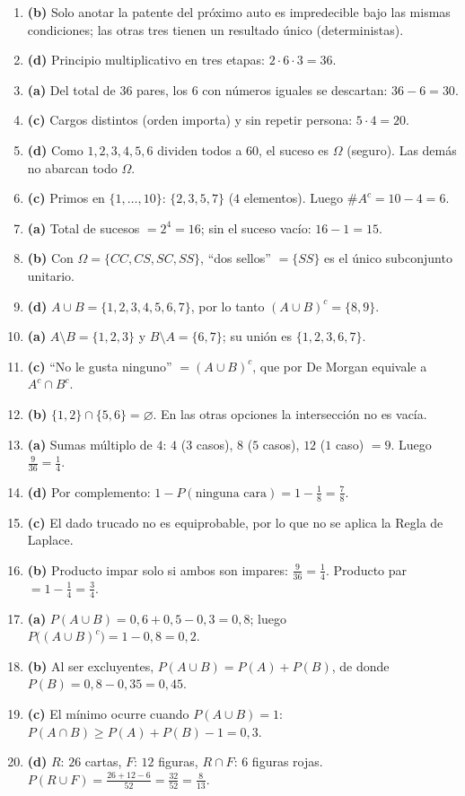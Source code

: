\documentclass[12pt, a4paper]{article}
\begin{document}
\begin{enumerate}[leftmargin=*, itemsep=4pt]
    \item \textbf{(b)} Solo anotar la patente del próximo auto es impredecible bajo las mismas condiciones; las otras tres tienen un resultado único (deterministas).
    \item \textbf{(d)} Principio multiplicativo en tres etapas: $2 \cdot 6 \cdot 3 = 36$.
    \item \textbf{(a)} Del total de $36$ pares, los $6$ con números iguales se descartan: $36 - 6 = 30$.
    \item \textbf{(c)} Cargos distintos (orden importa) y sin repetir persona: $5 \cdot 4 = 20$.
    \item \textbf{(d)} Como $1,2,3,4,5,6$ dividen todos a $60$, el suceso es $\Omega$ (seguro). Las demás no abarcan todo $\Omega$.
    \item \textbf{(c)} Primos en $\{1,\dots,10\}$: $\{2,3,5,7\}$ ($4$ elementos). Luego $\#A^c = 10 - 4 = 6$.
    \item \textbf{(a)} Total de sucesos $= 2^4 = 16$; sin el suceso vacío: $16 - 1 = 15$.
    \item \textbf{(b)} Con $\Omega = \{CC, CS, SC, SS\}$, ``dos sellos'' $= \{SS\}$ es el único subconjunto unitario.
    \item \textbf{(d)} $A \cup B = \{1,2,3,4,5,6,7\}$, por lo tanto $(A \cup B)^c = \{8, 9\}$.
    \item \textbf{(a)} $A \setminus B = \{1,2,3\}$ y $B \setminus A = \{6,7\}$; su unión es $\{1,2,3,6,7\}$.
    \item \textbf{(c)} ``No le gusta ninguno'' $= (A \cup B)^c$, que por De Morgan equivale a $A^c \cap B^c$.
    \item \textbf{(b)} $\{1,2\} \cap \{5,6\} = \varnothing$. En las otras opciones la intersección no es vacía.
    \item \textbf{(a)} Sumas múltiplo de $4$: $4$ ($3$ casos), $8$ ($5$ casos), $12$ ($1$ caso) $= 9$. Luego $\tfrac{9}{36} = \tfrac{1}{4}$.
    \item \textbf{(d)} Por complemento: $1 - P(\text{ninguna cara}) = 1 - \tfrac{1}{8} = \tfrac{7}{8}$.
    \item \textbf{(c)} El dado trucado no es equiprobable, por lo que no se aplica la Regla de Laplace.
    \item \textbf{(b)} Producto impar solo si ambos son impares: $\tfrac{9}{36} = \tfrac{1}{4}$. Producto par $= 1 - \tfrac{1}{4} = \tfrac{3}{4}$.
    \item \textbf{(a)} $P(A \cup B) = 0{,}6 + 0{,}5 - 0{,}3 = 0{,}8$; luego $P\big((A\cup B)^c\big) = 1 - 0{,}8 = 0{,}2$.
    \item \textbf{(b)} Al ser excluyentes, $P(A \cup B) = P(A) + P(B)$, de donde $P(B) = 0{,}8 - 0{,}35 = 0{,}45$.
    \item \textbf{(c)} El mínimo ocurre cuando $P(A \cup B) = 1$: $P(A \cap B) \ge P(A) + P(B) - 1 = 0{,}3$.
    \item \textbf{(d)} $R$: $26$ cartas, $F$: $12$ figuras, $R \cap F$: $6$ figuras rojas. $P(R \cup F) = \tfrac{26 + 12 - 6}{52} = \tfrac{32}{52} = \tfrac{8}{13}$.
\end{enumerate}
\end{document}
